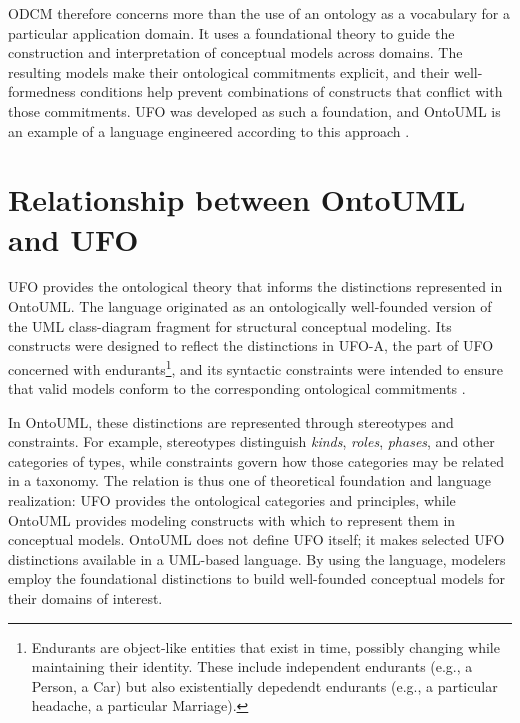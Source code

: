 ODCM therefore concerns more than the use of an ontology as a vocabulary for a particular application domain. It uses a foundational theory to guide the construction and interpretation of conceptual models across domains. The resulting models make their ontological commitments explicit, and their well-formedness conditions help prevent combinations of constructs that conflict with those commitments. UFO was developed as such a foundation, and OntoUML is an example of a language engineered according to this approach \cite{towards_ontological_foundations_for_conceptual_modeling__the_unified_foundational_ontology__ufo__story_2015}. 

\section{Relationship between OntoUML and UFO}

UFO provides the ontological theory that informs the distinctions represented in OntoUML. The language originated as an ontologically well-founded version of the UML class-diagram fragment for structural conceptual modeling. Its constructs were designed to reflect the distinctions in UFO-A, the part of UFO concerned with endurants\footnote{Endurants are object-like entities that exist in time, possibly changing while maintaining their identity. These include independent endurants (e.g., a Person, a Car) but also existentially depedendt endurants (e.g., a particular headache, a particular Marriage).}, and its syntactic constraints were intended to ensure that valid models conform to the corresponding ontological commitments \cite{towards_ontological_foundations_for_conceptual_modeling__the_unified_foundational_ontology__ufo__story_2015}.

In OntoUML, these distinctions are represented through stereotypes and constraints. For example, stereotypes distinguish \textit{kinds}, \textit{roles}, \textit{phases}, and other categories of types, while constraints govern how those categories may be related in a taxonomy. The relation is thus one of theoretical foundation and language realization: UFO provides the ontological categories and principles, while OntoUML provides modeling constructs with which to represent them in conceptual models. OntoUML does not define UFO itself; it makes selected UFO distinctions available in a UML-based language. By using the language, modelers employ the foundational distinctions to build well-founded conceptual models for their domains of interest.

